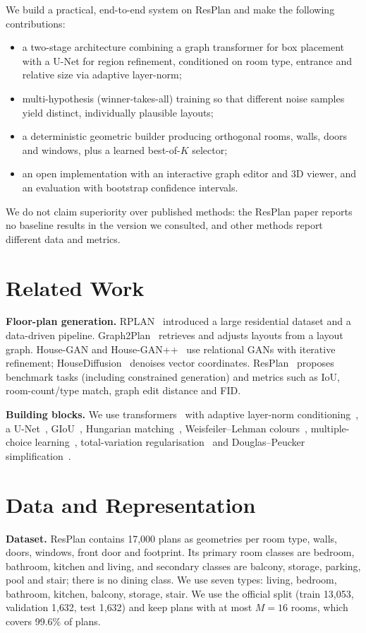 \documentclass[conference]{IEEEtran}
\begin{document}
We build a practical, end-to-end system on ResPlan and make the following contributions:
\begin{itemize}
\item a two-stage architecture combining a graph transformer for box placement with a U-Net for region refinement, conditioned on room type, entrance and relative size via adaptive layer-norm;
\item multi-hypothesis (winner-takes-all) training so that different noise samples yield distinct, individually plausible layouts;
\item a deterministic geometric builder producing orthogonal rooms, walls, doors and windows, plus a learned best-of-$K$ selector;
\item an open implementation with an interactive graph editor and 3D viewer, and an evaluation with bootstrap confidence intervals.
\end{itemize}
We do not claim superiority over published methods: the ResPlan paper reports no baseline results in the version we consulted, and other methods report different data and metrics.

\section{Related Work}
\textbf{Floor-plan generation.} RPLAN~\cite{wu2019rplan} introduced a large residential dataset and a data-driven pipeline. Graph2Plan~\cite{hu2020graph2plan} retrieves and adjusts layouts from a layout graph. House-GAN and House-GAN++~\cite{nauata2020housegan,nauata2021housegan++} use relational GANs with iterative refinement; HouseDiffusion~\cite{shabani2023housediffusion} denoises vector coordinates. ResPlan~\cite{abouagour2025resplan} proposes benchmark tasks (including constrained generation) and metrics such as IoU, room-count/type match, graph edit distance and FID.

\textbf{Building blocks.} We use transformers~\cite{vaswani2017attention} with adaptive layer-norm conditioning~\cite{peebles2023dit,perez2018film}, a U-Net~\cite{ronneberger2015unet}, GIoU~\cite{rezatofighi2019giou}, Hungarian matching~\cite{kuhn1955hungarian}, Weisfeiler--Lehman colours~\cite{shervashidze2011wl}, multiple-choice learning~\cite{guzman2012mcl}, total-variation regularisation~\cite{rudin1992tv} and Douglas--Peucker simplification~\cite{douglas1973peucker}.

\section{Data and Representation}
\textbf{Dataset.} ResPlan contains 17{,}000 plans as geometries per room type, walls, doors, windows, front door and footprint. Its primary room classes are bedroom, bathroom, kitchen and living, and secondary classes are balcony, storage, parking, pool and stair; there is no dining class. We use seven types: living, bedroom, bathroom, kitchen, balcony, storage, stair. We use the official split (train 13{,}053, validation 1{,}632, test 1{,}632) and keep plans with at most $M=16$ rooms, which covers 99.6\% of plans.
\end{document}
